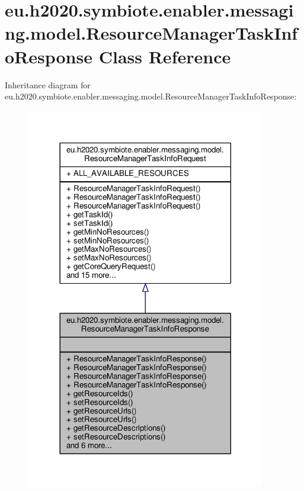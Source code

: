\hypertarget{classeu_1_1h2020_1_1symbiote_1_1enabler_1_1messaging_1_1model_1_1ResourceManagerTaskInfoResponse}{}\section{eu.\+h2020.\+symbiote.\+enabler.\+messaging.\+model.\+Resource\+Manager\+Task\+Info\+Response Class Reference}
\label{classeu_1_1h2020_1_1symbiote_1_1enabler_1_1messaging_1_1model_1_1ResourceManagerTaskInfoResponse}


Inheritance diagram for eu.\+h2020.\+symbiote.\+enabler.\+messaging.\+model.\+Resource\+Manager\+Task\+Info\+Response\+:\nopagebreak
\begin{figure}[H]
\begin{center}
\leavevmode
\includegraphics[width=296pt]{classeu_1_1h2020_1_1symbiote_1_1enabler_1_1messaging_1_1model_1_1ResourceManagerTaskInfoResponse__inherit__graph}
\end{center}
\end{figure}


